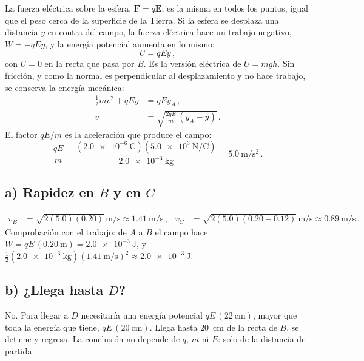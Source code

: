 \documentclass[11pt,a4paper]{book}
\begin{document}
La fuerza eléctrica sobre la esfera, $\boldsymbol{F} = q\boldsymbol{E}$, es la misma en todos los puntos, igual que el peso cerca de la superficie de la Tierra. Si la esfera se desplaza una distancia $y$ en contra del campo, la fuerza eléctrica hace un trabajo negativo, $W = -qEy$, y la energía potencial aumenta en lo mismo:
\begin{equation}
    U = qEy\,,
\end{equation}
con $U = 0$ en la recta que pasa por $B$. Es la versión eléctrica de $U = mgh$. Sin fricción, y como la normal es perpendicular al desplazamiento y no hace trabajo, se conserva la energía mecánica:
\begin{align}
    \frac{1}{2}mv^2 + qEy &= qEy_A\,, \nonumber\\
    v &= \sqrt{\frac{2qE}{m}\,(y_A - y)}\,.
\end{align}
El factor $qE/m$ es la aceleración que produce el campo:
\begin{equation}
    \frac{qE}{m} = \frac{(\SI{2.0e-6}{\coulomb})(\SI{5.0e3}{\newton\per\coulomb})}{\SI{2.0e-3}{\kilogram}} = \SI{5.0}{\meter\per\second\squared}\,.
\end{equation}

\subsection*{a) Rapidez en $B$ y en $C$}
\begin{align}
    v_B &= \sqrt{2(5.0)(0.20)}\,\si{\meter\per\second} \approx \SI{1.41}{\meter\per\second}\,, &
    v_C &= \sqrt{2(5.0)(0.20 - 0.12)}\,\si{\meter\per\second} \approx \SI{0.89}{\meter\per\second}\,.
\end{align}
Comprobación con el trabajo: de $A$ a $B$ el campo hace $W = qE\,(\SI{0.20}{\meter}) = \SI{2.0e-3}{\joule}$, y $\tfrac{1}{2}(\SI{2.0e-3}{\kilogram})(\SI{1.41}{\meter\per\second})^2 \approx \SI{2.0e-3}{\joule}$.

\subsection*{b) ¿Llega hasta $D$?}
No. Para llegar a $D$ necesitaría una energía potencial $qE\,(\SI{22}{\centi\meter})$, mayor que toda la energía que tiene, $qE\,(\SI{20}{\centi\meter})$. Llega hasta \SI{20}{\centi\meter} de la recta de $B$, se detiene y regresa. La conclusión no depende de $q$, $m$ ni $E$: solo de la distancia de partida.
\end{document}
